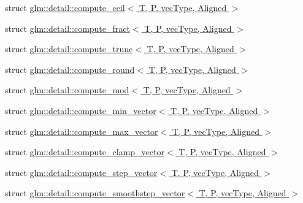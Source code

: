 \begin{DoxyCompactItemize}
struct \hyperlink{structglm_1_1detail_1_1compute__ceil}{glm\+::detail\+::compute\+\_\+ceil$<$ T, P, vec\+Type, Aligned $>$}
\item 
struct \hyperlink{structglm_1_1detail_1_1compute__fract}{glm\+::detail\+::compute\+\_\+fract$<$ T, P, vec\+Type, Aligned $>$}
\item 
struct \hyperlink{structglm_1_1detail_1_1compute__trunc}{glm\+::detail\+::compute\+\_\+trunc$<$ T, P, vec\+Type, Aligned $>$}
\item 
struct \hyperlink{structglm_1_1detail_1_1compute__round}{glm\+::detail\+::compute\+\_\+round$<$ T, P, vec\+Type, Aligned $>$}
\item 
struct \hyperlink{structglm_1_1detail_1_1compute__mod}{glm\+::detail\+::compute\+\_\+mod$<$ T, P, vec\+Type, Aligned $>$}
\item 
struct \hyperlink{structglm_1_1detail_1_1compute__min__vector}{glm\+::detail\+::compute\+\_\+min\+\_\+vector$<$ T, P, vec\+Type, Aligned $>$}
\item 
struct \hyperlink{structglm_1_1detail_1_1compute__max__vector}{glm\+::detail\+::compute\+\_\+max\+\_\+vector$<$ T, P, vec\+Type, Aligned $>$}
\item 
struct \hyperlink{structglm_1_1detail_1_1compute__clamp__vector}{glm\+::detail\+::compute\+\_\+clamp\+\_\+vector$<$ T, P, vec\+Type, Aligned $>$}
\item 
struct \hyperlink{structglm_1_1detail_1_1compute__step__vector}{glm\+::detail\+::compute\+\_\+step\+\_\+vector$<$ T, P, vec\+Type, Aligned $>$}
\item 
struct \hyperlink{structglm_1_1detail_1_1compute__smoothstep__vector}{glm\+::detail\+::compute\+\_\+smoothstep\+\_\+vector$<$ T, P, vec\+Type, Aligned $>$}
\end{DoxyCompactItemize}
